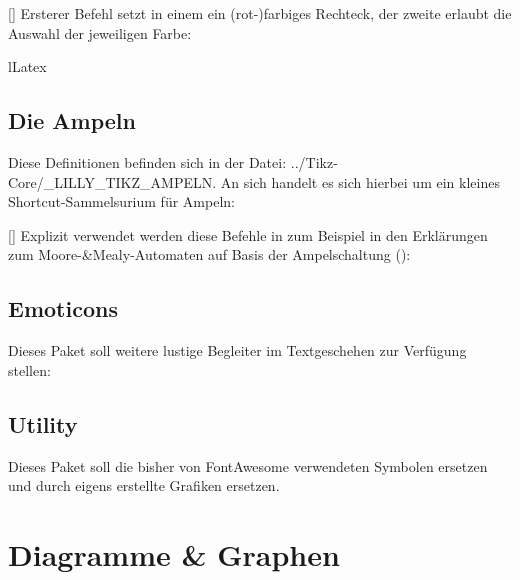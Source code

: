 %
%
%

[\cmdlist{}]
Ersterer Befehl setzt in einem  ein (rot-)farbiges Rechteck, der zweite erlaubt die Auswahl der jeweiligen Farbe:
\begin{defaultlst}[][listing side text,righthand width=2cm]{lLatex}
\end{defaultlst}



\subsection{Die Ampeln}
Diese Definitionen befinden sich in der Datei: {\ltt../Tikz-Core/\_LILLY\_TIKZ\_AMPELN}.
An sich handelt es sich hierbei um ein kleines Shortcut-Sammelsurium für Ampeln:\medskip

%
%
%

[\cmdlist {}\cmdlist {}\cmdlist {}]
Explizit verwendet werden diese Befehle in zum Beispiel in den Erklärungen zum Moore-\&Mealy-Automaten auf Basis der Ampelschaltung (\!\ampelG\ampelY\ampelH):

\subsection{Emoticons  }
Dieses Paket soll weitere lustige Begleiter im Textgeschehen zur Verfügung stellen:

\subsection{Utility  }
Dieses Paket soll die bisher von FontAwesome verwendeten Symbolen ersetzen und durch eigens erstellte Grafiken ersetzen.

%
%
%
%
%

\section{Diagramme \& Graphen}
